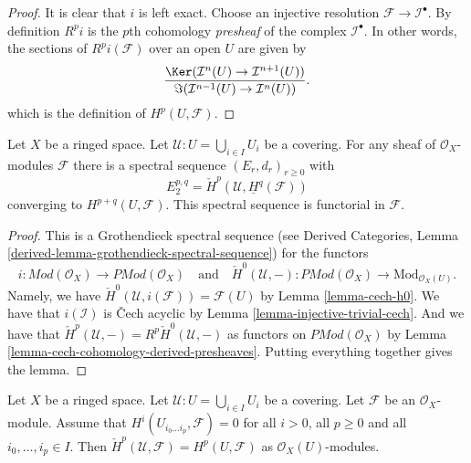 \begin{proof}
It is clear that $i$ is left exact.
Choose an injective resolution $\mathcal{F} \to \mathcal{I}^\bullet$.
By definition $R^pi$ is the $p$th cohomology {\it presheaf}
of the complex $\mathcal{I}^\bullet$. In other words, the
sections of $R^pi(\mathcal{F})$ over an open $U$ are given by
$$
\frac{\Ker(\mathcal{I}^n(U) \to \mathcal{I}^{n + 1}(U))}
{\Im(\mathcal{I}^{n - 1}(U) \to \mathcal{I}^n(U))}.
$$
which is the definition of $H^p(U, \mathcal{F})$.
\end{proof}

\begin{lemma}
\label{lemma-cech-spectral-sequence}
Let $X$ be a ringed space.
Let $\mathcal{U} : U = \bigcup_{i \in I} U_i$ be a covering.
For any sheaf of $\mathcal{O}_X$-modules $\mathcal{F}$ there
is a spectral sequence $(E_r, d_r)_{r \geq 0}$ with
$$
E_2^{p, q} = \check{H}^p(\mathcal{U}, \underline{H}^q(\mathcal{F}))
$$
converging to $H^{p + q}(U, \mathcal{F})$.
This spectral sequence is functorial in $\mathcal{F}$.
\end{lemma}

\begin{proof}
This is a Grothendieck spectral sequence
(see
Derived Categories, Lemma \ref{derived-lemma-grothendieck-spectral-sequence})
for the functors
$$
i :  \textit{Mod}(\mathcal{O}_X) \to \textit{PMod}(\mathcal{O}_X)
\quad\text{and}\quad
\check{H}^0(\mathcal{U}, - ) : \textit{PMod}(\mathcal{O}_X)
\to \text{Mod}_{\mathcal{O}_X(U)}.
$$
Namely, we have $\check{H}^0(\mathcal{U}, i(\mathcal{F})) = \mathcal{F}(U)$
by Lemma \ref{lemma-cech-h0}. We have that $i(\mathcal{I})$ is
{\v C}ech acyclic by Lemma \ref{lemma-injective-trivial-cech}. And we
have that $\check{H}^p(\mathcal{U}, -) = R^p\check{H}^0(\mathcal{U}, -)$
as functors on $\textit{PMod}(\mathcal{O}_X)$
by Lemma \ref{lemma-cech-cohomology-derived-presheaves}.
Putting everything together gives the lemma.
\end{proof}

\begin{lemma}
\label{lemma-cech-spectral-sequence-application}
Let $X$ be a ringed space.
Let $\mathcal{U} : U = \bigcup_{i \in I} U_i$ be a covering.
Let $\mathcal{F}$ be an $\mathcal{O}_X$-module.
Assume that $H^i(U_{i_0 \ldots i_p}, \mathcal{F}) = 0$
for all $i > 0$, all $p \geq 0$ and all $i_0, \ldots, i_p \in I$.
Then $\check{H}^p(\mathcal{U}, \mathcal{F}) = H^p(U, \mathcal{F})$
as $\mathcal{O}_X(U)$-modules.
\end{lemma}

